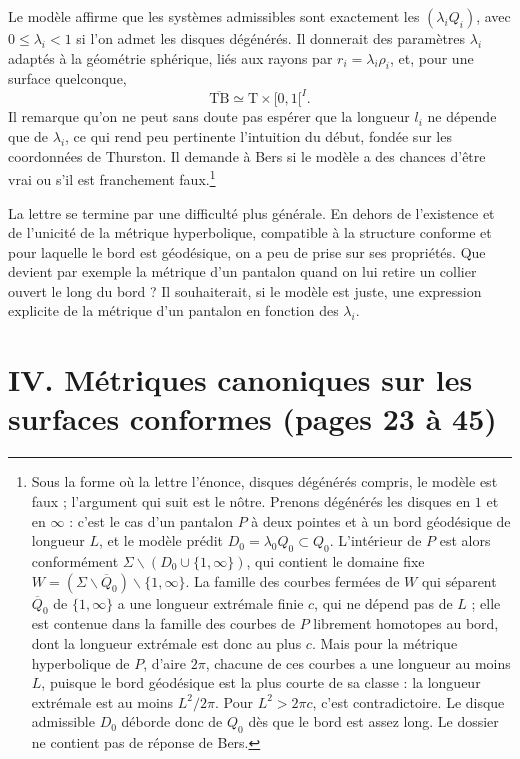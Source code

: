 \documentclass[11pt,a4paper]{article}
\begin{document}
Le modèle affirme que les systèmes admissibles sont exactement les
$(\lambda_i Q_i)$, avec $0 \leqslant \lambda_i < 1$ si l'on admet les disques
dégénérés. Il donnerait des paramètres $\lambda_i$ adaptés à la géométrie
sphérique, liés aux rayons par $r_i = \lambda_i \rho_i$, et, pour une surface
quelconque,
\[
\overline{\mathrm{TB}} \simeq \mathrm{T} \times [0,1[^{I}.
\]
Il remarque qu'on ne peut sans doute pas espérer que la longueur $l_i$ ne
dépende que de $\lambda_i$, ce qui rend peu pertinente l'intuition du début,
fondée sur les coordonnées de Thurston. Il demande à Bers si le modèle a des
chances d'être vrai ou s'il est franchement faux.\footnote{Sous la forme où la
lettre l'énonce, disques dégénérés compris, le modèle est faux ; l'argument
qui suit est le nôtre. Prenons dégénérés les disques en $1$ et en $\infty$ :
c'est le cas d'un pantalon $P$ à deux pointes et à un bord géodésique de
longueur $L$, et le modèle prédit $D_0 = \lambda_0 Q_0 \subset Q_0$.
L'intérieur de $P$ est alors conformément
$\Sigma \smallsetminus (D_0 \cup \{1,\infty\})$, qui contient le domaine
fixe $W = (\Sigma \smallsetminus \overline{Q}_0) \smallsetminus
\{1, \infty\}$. La famille des courbes fermées de $W$ qui séparent
$\overline{Q}_0$ de $\{1,\infty\}$ a une longueur extrémale finie $c$, qui
ne dépend pas de $L$ ; elle est contenue dans la famille des courbes de $P$
librement homotopes au bord, dont la longueur extrémale est donc au plus $c$.
Mais pour la métrique hyperbolique de $P$, d'aire $2\pi$, chacune de ces
courbes a une longueur au moins $L$, puisque le bord géodésique est la plus
courte de sa classe : la longueur extrémale est au moins $L^{2}/2\pi$. Pour
$L^{2} > 2\pi c$, c'est contradictoire. Le disque admissible $D_0$ déborde
donc de $Q_0$ dès que le bord est assez long. Le dossier ne contient pas de
réponse de Bers.}

La lettre se termine par une difficulté plus générale. En dehors de
l'existence et de l'unicité de la métrique hyperbolique, compatible à la
structure conforme et pour laquelle le bord est géodésique, on a peu de prise
sur ses propriétés. Que devient par exemple la métrique d'un pantalon quand
on lui retire un collier ouvert le long du bord ? Il souhaiterait, si le
modèle est juste, une expression explicite de la métrique d'un pantalon en
fonction des $\lambda_i$.

\section*{IV. Métriques canoniques sur les surfaces conformes (pages 23 à 45)}
\end{document}
